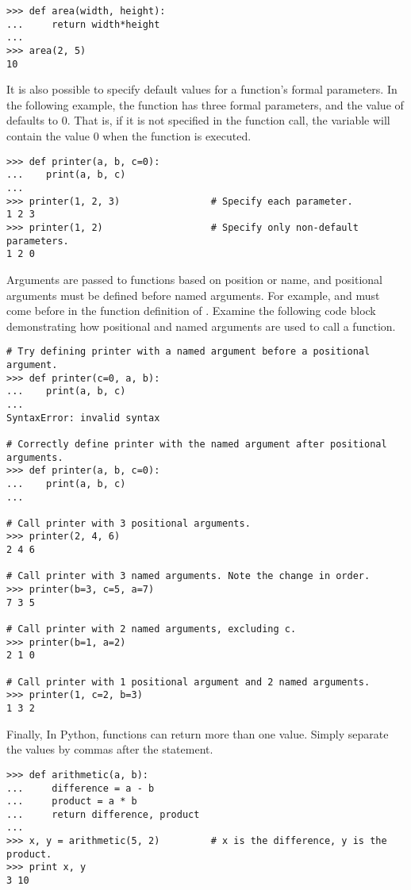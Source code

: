 \begin{lstlisting}
>>> def area(width, height):
...     return width*height
...         
>>> area(2, 5)
10
\end{lstlisting}

It is also possible to specify default values for a function's formal parameters.
In the following example, the function  has three formal parameters, and the value of  defaults to 0.
That is, if it is not specified in the function call, the variable  will contain the value 0 when the function is executed.

\begin{lstlisting}
>>> def printer(a, b, c=0):
...    print(a, b, c)
...
>>> printer(1, 2, 3)                # Specify each parameter.
1 2 3
>>> printer(1, 2)                   # Specify only non-default parameters.
1 2 0
\end{lstlisting} %

Arguments are passed to functions based on position or name, and positional arguments must be defined before named arguments.
For example,  and  must come before  in the function definition of .
Examine the following code block demonstrating how positional and named arguments are used to call a function.
\begin{lstlisting}
# Try defining printer with a named argument before a positional argument.
>>> def printer(c=0, a, b):
...    print(a, b, c)
...
SyntaxError: invalid syntax

# Correctly define printer with the named argument after positional arguments.
>>> def printer(a, b, c=0):
...    print(a, b, c)
...

# Call printer with 3 positional arguments.
>>> printer(2, 4, 6)
2 4 6

# Call printer with 3 named arguments. Note the change in order.
>>> printer(b=3, c=5, a=7)
7 3 5

# Call printer with 2 named arguments, excluding c.
>>> printer(b=1, a=2)
2 1 0

# Call printer with 1 positional argument and 2 named arguments.
>>> printer(1, c=2, b=3)
1 3 2
\end{lstlisting}

Finally, In Python, functions can return more than one value.
Simply separate the values by commas after the  statement.

\begin{lstlisting}
>>> def arithmetic(a, b):
...     difference = a - b
...     product = a * b
...     return difference, product
...
>>> x, y = arithmetic(5, 2)         # x is the difference, y is the product.
>>> print x, y
3 10
\end{lstlisting}


